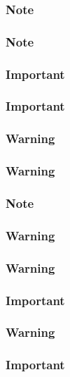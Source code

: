 \subsubsection{Note}

\subsubsection{Note}

\subsubsection{Important}

\subsubsection{Important}

\subsubsection{Warning}

\subsubsection{Warning}

\subsubsection{Note}

\subsubsection{Warning}

\subsubsection{Warning}

\subsubsection{Important}

\subsubsection{Warning}

\subsubsection{Important}

